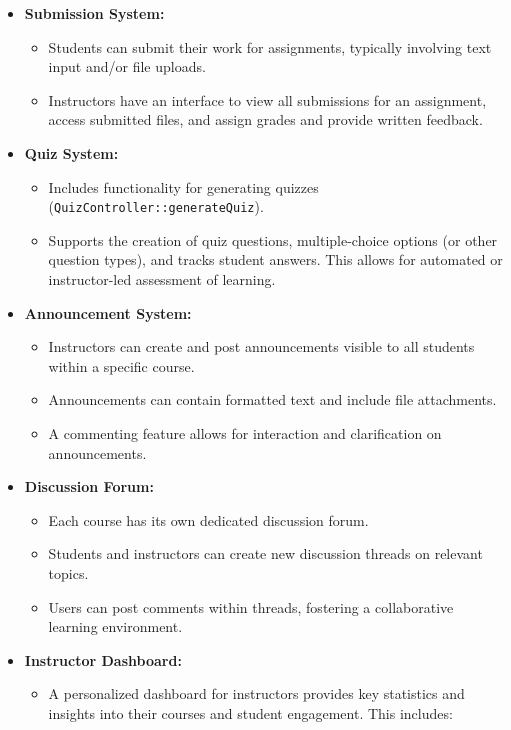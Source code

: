 \documentclass[12pt,a4paper]{article}
\begin{document}
\begin{itemize}
    \item \textbf{Submission System:}
    \begin{itemize}
        \item Students can submit their work for assignments, typically involving text input and/or file uploads.
        \item Instructors have an interface to view all submissions for an assignment, access submitted files, and assign grades and provide written feedback.
    \end{itemize}
    \item \textbf{Quiz System:}
    \begin{itemize}
        \item Includes functionality for generating quizzes (\texttt{QuizController::generateQuiz}).
        \item Supports the creation of quiz questions, multiple-choice options (or other question types), and tracks student answers. This allows for automated or instructor-led assessment of learning.
    \end{itemize}
    \item \textbf{Announcement System:}
    \begin{itemize}
        \item Instructors can create and post announcements visible to all students within a specific course.
        \item Announcements can contain formatted text and include file attachments.
        \item A commenting feature allows for interaction and clarification on announcements.
    \end{itemize}
    \item \textbf{Discussion Forum:}
    \begin{itemize}
        \item Each course has its own dedicated discussion forum.
        \item Students and instructors can create new discussion threads on relevant topics.
        \item Users can post comments within threads, fostering a collaborative learning environment.
    \end{itemize}
    \item \textbf{Instructor Dashboard:}
    \begin{itemize}
        \item A personalized dashboard for instructors provides key statistics and insights into their courses and student engagement. This includes:

\end{itemize}
\end{itemize}
\end{document}
